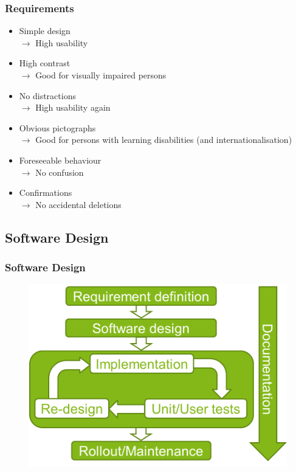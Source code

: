 \documentclass[9pt]{beamer}
\begin{document}
		\begin{frame}
			\frametitle{Requirements}
			\begin{itemize}[<+->]
				\item Simple design\\
				$\rightarrow$ High usability
				\item High contrast\\
				$\rightarrow$ Good for visually impaired persons
				\item No distractions\\
				$\rightarrow$ High usability again
				\item Obvious pictographs\\
				$\rightarrow$ Good for persons with learning disabilities (and internationalisation)
				\item Foreseeable behaviour\\
				$\rightarrow$ No confusion
				\item Confirmations\\
				$\rightarrow$ No accidental deletions
			\end{itemize}
		\end{frame}
	
		\subsection{Software Design}
			\begin{frame}
				\frametitle{Software Design}
				\begin{figure}
					\centering
					\includegraphics[scale=0.25]{Images/project_schedule_2.png}
				\end{figure}
			\end{frame}
			
\end{document}
